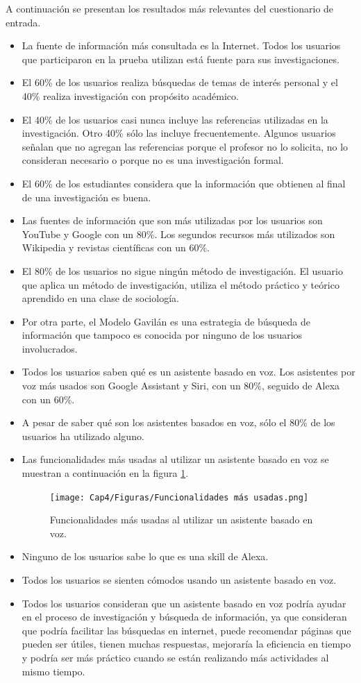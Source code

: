 A continuación se presentan los resultados más relevantes del cuestionario de entrada.

\begin{itemize}
  \item La fuente de información más consultada es la Internet. Todos los usuarios que participaron en la prueba utilizan está fuente para sus investigaciones.
  \item El 60\% de los usuarios realiza búsquedas de temas de interés personal y el 40\% realiza investigación con propósito académico.
  \item El 40\% de los usuarios casi nunca incluye las referencias utilizadas en la investigación. Otro 40\% sólo las incluye frecuentemente. Algunos usuarios señalan que no agregan las referencias porque el profesor no lo solicita, no lo consideran necesario o porque no es una investigación formal.  
  \item El 60\% de los estudiantes considera que la información que obtienen al final de una investigación es buena.
  \item Las fuentes de información que son más utilizadas por los usuarios son YouTube y Google con un 80\%. Los segundos recursos más utilizados son Wikipedia y revistas científicas con un 60\%.
  \item El 80\% de los usuarios no sigue ningún método de investigación. El usuario que aplica un método de investigación, utiliza el método práctico y teórico aprendido en una clase de sociología.
  \item Por otra parte, el Modelo Gavilán es una estrategia de búsqueda de información que tampoco es conocida por ninguno de los usuarios involucrados.
  \item Todos los usuarios saben qué es un asistente basado en voz. Los asistentes por voz más usados son Google Assistant y Siri, con un 80\%, seguido de Alexa con un 60\%.
  \item A pesar de saber qué son los asistentes basados en voz, sólo el 80\% de los usuarios ha utilizado alguno.
  \item Las funcionalidades más usadas al utilizar un asistente basado en voz se muestran a continuación en la figura \ref{fig:425}.
  \begin{figure}
    \centering
    \texttt{[image: Cap4/Figuras/Funcionalidades más usadas.png]}
    \caption{Funcionalidades más usadas al utilizar un asistente basado en voz.}
    \label{fig:425}
  \end{figure}
  \item Ninguno de los usuarios sabe lo que es una skill de Alexa.
  \item Todos los usuarios se sienten cómodos usando un asistente basado en voz.
  \item Todos los usuarios consideran que un asistente basado en voz podría ayudar en el proceso de investigación y búsqueda de información, ya que consideran que podría facilitar las búsquedas en internet, puede recomendar páginas que pueden ser útiles, tienen muchas respuestas, mejoraría la eficiencia en tiempo y podría ser más práctico cuando se están realizando más actividades al mismo tiempo.
\end{itemize}

